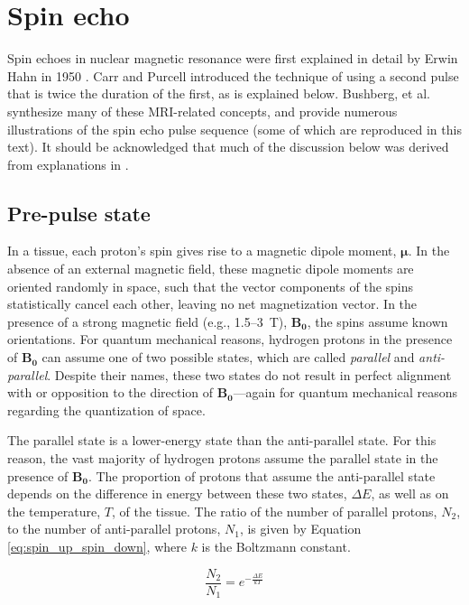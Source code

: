 \documentclass[12pt]{article} %
\renewcommand{\vec}[1]{\mathbf{#1}}
\begin{document}
\section{Spin echo}
Spin echoes in nuclear magnetic resonance were first explained in detail by Erwin Hahn in 1950 \cite{hahn1950a, hahn1950b}.
Carr and Purcell \cite{carr1954} introduced the technique of using a second pulse that is twice the duration of the first, as is explained below. Bushberg, et al. \cite{bushberg2002} synthesize many of these MRI-related concepts, and provide numerous illustrations of the spin echo pulse sequence (some of which are reproduced in this text). It should be acknowledged that much of the discussion below was derived from explanations in \cite{bushberg2002}.

\subsection{Pre-pulse state}
In a tissue, each proton's spin gives rise to a magnetic dipole moment, $\boldsymbol{\mu}$.
In the absence of an external magnetic field, these magnetic dipole moments are oriented randomly in space, such that the vector components of the spins statistically cancel each other, leaving no net magnetization vector. In the presence of a strong magnetic field (e.g., 1.5--3~T), $\vec{B_{0}}$, the spins assume known orientations. For quantum mechanical reasons, hydrogen protons in the presence of $\vec{B_{0}}$ can assume one of two possible states, which are called \textit{parallel} and \textit{anti-parallel}. Despite their names, these two states do not result in perfect alignment with or opposition to the direction of $\vec{B_{0}}$---again for quantum mechanical reasons regarding the quantization of space.

The parallel state is a lower-energy state than the anti-parallel state. For this reason, the vast majority of hydrogen protons assume the parallel state in the presence of $\vec{B_{0}}$. The proportion of protons that assume the anti-parallel state depends on the difference in energy between these two states, $\Delta E$, as well as on the temperature, $T$, of the tissue. The ratio of the number of parallel protons, $N_{2}$, to the number of anti-parallel protons, $N_{1}$, is given by Equation \ref{eq:spin_up_spin_down}, where $k$ is the Boltzmann constant.

\begin{equation}
\frac{N_{2}}{N_{1}} = e^{-\frac{\Delta E}{kT}}
\label{eq:spin_up_spin_down}
\end{equation}
\end{document}
